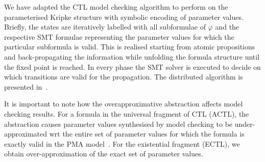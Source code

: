 \documentclass{llncs}
\begin{document}
We have adapted the CTL model checking algorithm to perform on the parameterised Kripke structure with symbolic encoding of parameter values. Briefly, the states are iteratively labelled with all subformulae of $\varphi$ and the respective SMT formulae representing the parameter values for which the particular subformula is valid. This is realised starting from atomic propositions and back-propagating the information while unfolding the formula structure until the fixed point is reached. In every phase the SMT solver is executed to decide on which transitions are valid for the propagation. The distributed algorithm is presented in~\cite{ATVA}.

\begin{remark}
It is important to note how the overapproximative abstraction affects model checking results. For a formula in the universal fragment of CTL (ACTL), the abstraction causes parameter values synthesised by model checking to be under-approximated wrt the entire set of parameter values for which the formula is exactly valid in the PMA model~\cite{Batt2007}. For the existential fragment (ECTL), we obtain over-approximation of the exact set of parameter values.
\end{remark}

\end{document}
